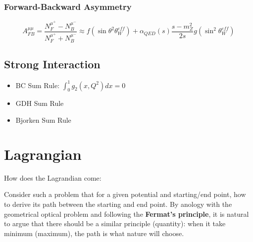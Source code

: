 \subsubsection{Forward-Backward Asymmetry}
\begin{figure}[h]
    \qquad
\end{figure}
\begin{equation*}
    A_{FB}^{\mu\mu} = \frac{N_F^{\mu^+} - N_B^{\mu^-}}{N_F^{\mu^+} + N_B^{\mu^-}}
    \approx f(\sin\theta^2\theta_W^{eff}) + \alpha_{QED}(s)\frac{s-m_Z^2}{2s}g(\sin^2\theta_W^{eff})
\end{equation*}

\subsection{Strong Interaction}
\begin{itemize}
    \item BC Sum Rule\cite{BURKHARDT1970453}: $\int_0^1 g_2(x, Q^2) dx = 0$ 
    \item GDH Sum Rule
    \item Bjorken Sum Rule
\end{itemize}

\section{Lagrangian}
How does the Lagrandian come:

Consider such a problem that for a given potential and starting/end point, how
to derive its path between the starting and end point. By anology with the 
geometrical optical problem and following the \textbf{Fermat's principle}, it
is natural to argue that there should be a similar principle (quantity): when 
it take minimum (maximum), the path is what nature will choose. 

